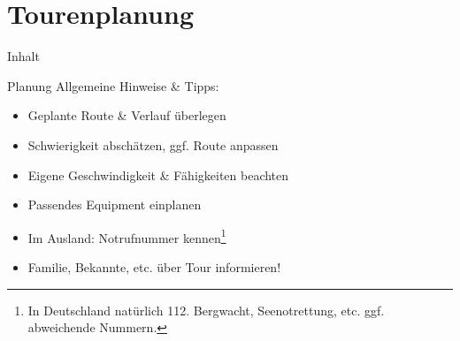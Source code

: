 \documentclass{beamer}
\begin{document}
	\section{Tourenplanung}
		
		\begin{frame}[t]{Inhalt}
		\end{frame}
		
		\begin{frame}{Planung}
			Allgemeine Hinweise \& Tipps:
			\begin{itemize}
				\item Geplante Route \& Verlauf überlegen
				\item Schwierigkeit abschätzen, ggf. Route anpassen
				\item Eigene Geschwindigkeit \& Fähigkeiten beachten
				\item Passendes Equipment einplanen
				\item Im Ausland: Notrufnummer kennen\footnote{In Deutschland natürlich 112. Bergwacht, Seenotrettung, etc. ggf. abweichende Nummern.}
				\item Familie, Bekannte, etc. über Tour informieren!
			\end{itemize}
		\end{frame}
		
\end{document}
